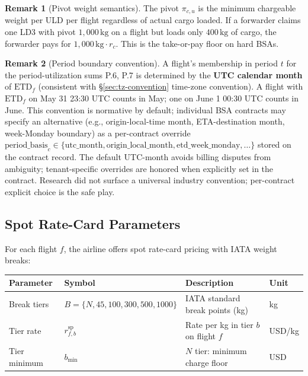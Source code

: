 \documentclass[11pt,a4paper]{article}
\theoremstyle{definition}
\newtheorem{remark}{Remark}
\begin{document}
\begin{remark}[Pivot weight semantics]
The pivot $\pi_{c,u}$ is the minimum chargeable weight per ULD per flight regardless of actual
cargo loaded. If a forwarder claims one LD3 with pivot $1{,}000\,\text{kg}$ on a flight but
loads only $400\,\text{kg}$ of cargo, the forwarder pays for $1{,}000\,\text{kg} \cdot r_c$.
This is the take-or-pay floor on hard BSAs.
\end{remark}

\begin{remark}[Period boundary convention]
\label{rem:bsa-period-boundary}
A flight's membership in period $t$ for the period-utilization sums P.6, P.7 is
determined by the \textbf{UTC calendar month} of $\text{ETD}_f$ (consistent with
\S\ref{sec:tz-convention} time-zone convention). A flight with $\text{ETD}_f$ on
May 31 23:30 UTC counts in May; one on June 1 00:30 UTC counts in June. This
convention is normative by default; individual BSA contracts may specify an
alternative (e.g., origin-local-time month, ETA-destination month, week-Monday
boundary) as a per-contract override $\text{period\_basis}_c \in
\{\text{utc\_month}, \text{origin\_local\_month}, \text{etd\_week\_monday}, \ldots\}$
stored on the contract record. The default UTC-month avoids billing disputes from
ambiguity; tenant-specific overrides are honored when explicitly set in the
contract. Research did not surface a universal industry convention; per-contract
explicit choice is the safe play.
\end{remark}

\subsection{Spot Rate-Card Parameters}
\label{sec:spot-params}

For each flight $f$, the airline offers spot rate-card pricing with IATA weight breaks:

\begin{center}
\begin{tabular}{llp{6.5cm}l}
\toprule
Parameter & Symbol & Description & Unit \\
\midrule
Break tiers & $B = \{N, 45, 100, 300, 500, 1000\}$ & IATA standard break points (kg) & kg \\
Tier rate & $r^{\text{sp}}_{f,b}$ & Rate per kg in tier $b$ on flight $f$ & USD/kg \\
Tier minimum & $b_{\min}$ & $N$ tier: minimum charge floor & USD \\
\bottomrule
\end{tabular}
\end{center}
\end{document}

